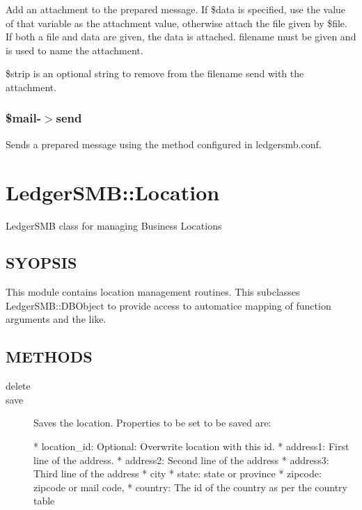 \begin{description}
\begin{description}
\begin{description}
\begin{description}
\begin{description}
\begin{description}
\begin{description}
\begin{description}
\begin{description}
\begin{description}
Add an attachment to the prepared message.  If \$data is specified, use the
value of that variable as the attachment value, otherwise attach the file
given by \$file.  If both a file and data are given, the data is attached.
filename must be given and is used to name the attachment.



\$strip is an optional string to remove from the filename send with the
attachment.

\subsubsection*{\$mail-$>$send\label{LedgerSMB::Mailer__mail-_send}}


Sends a prepared message using the method configured in ledgersmb.conf.

\section{LedgerSMB::Location\label{LedgerSMB::Location}}


LedgerSMB class for managing Business Locations

\subsection*{SYOPSIS\label{LedgerSMB::Location_SYOPSIS}}


This module contains location management routines.  This subclasses 
LedgerSMB::DBObject to provide access to automatice mapping of function 
arguments and the like.

\subsection*{METHODS\label{LedgerSMB::Location_METHODS}}
\begin{description}

\item[{delete}] \mbox{}
\item[{save}] \mbox{}

Saves the location.  Properties to be set to be saved are:



* location\_id: Optional:  Overwrite location with this id.
* address1: First line of the address.
* address2: Second line of the address
* address3: Third line of the address
* city
* state: state or province
* zipcode: zipcode or mail code, 
* country:  The id of the country as per the country table



\end{description}
\end{description}
\end{description}
\end{description}
\end{description}
\end{description}
\end{description}
\end{description}
\end{description}
\end{description}
\end{description}
